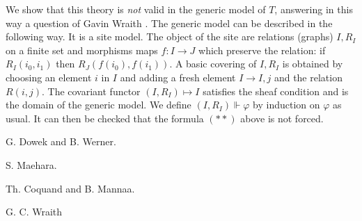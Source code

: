 \documentclass[10pt,a4paper]{article}
\begin{document}
 We show that this theory is {\em not} valid in the generic model of $T$, answering
in this way a question of Gavin Wraith \cite{Wraith}. The generic model can be described
in the following way. It is a site model. The object of the site are relations (graphs)
$I,R_I$ on a finite set
and morphisms maps $f:I\rightarrow J$ which preserve the relation: if $R_I(i_0,i_1)$
then $R_J(f(i_0),f(i_1))$. A basic covering of $I,R_I$ is obtained by choosing an element $i$
in $I$ and adding a fresh element $I\rightarrow I,j$ and the relation $R(i,j)$.
The covariant functor $(I,R_I)\longmapsto I$ satisfies the sheaf condition and is the domain
of the generic model. We define $(I,R_I)\Vdash\varphi$ by induction on $\varphi$ as usual.
It can then be checked that the formula $(**)$ above is not forced.

\begin{thebibliography}{9}

G. Dowek and B. Werner.

S. Maehara.

Th. Coquand and B. Mannaa.

G. C. Wraith

\end{thebibliography}
\end{document}
